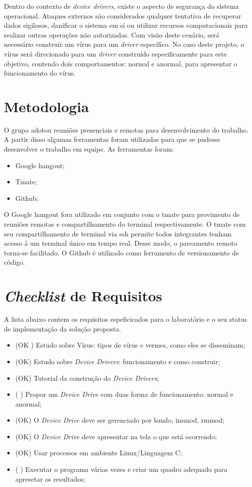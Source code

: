 Dentro do contexto de \textit{device drivers}, existe o aspecto de segurança do sistema operacional.
Ataques externos são considerados qualquer tentativa de recuperar dados sigilosos, danificar
o sistema em sí ou utilizar recursos computacionais para realizar outras operações não autorizadas.
Com visão deste cenário, será necessário construír um vírus para um \textit{driver} específico.
No caso deste projeto, o vírus será direcionado para um \textit{driver} construído especificamente para
este objetivo, contendo dois comportamentos: normal e anormal, para apresentar o
funcionamento do vírus.

\section{Metodologia}

O grupo adotou reuniões presenciais e remotas para desenvolvimento do trabalho. A partir
disso algumas ferramentas foram utilizadas para que se pudesse desenvolver o trabalho em
equipe. As ferramentas foram:

\begin{itemize}
  \item Google hangout;
  \item Tmate;
  \item Github;
\end{itemize}

O Google hangout fora utilizado em conjunto com o tmate para provimento de reuniões remotas
e compartilhamento do terminal respectivamente. O tmate com seu compartilhamento de terminal
via ssh permite todos integrantes tenham acesso á um terminal único em tempo real. Desse modo,
o pareamento remoto torna-se facilitado. O Github é utilizado como ferramento de versionamento
de código. 

\section{\textit{Checklist} de Requisitos}

A lista abaixo contem os requisitos espeficicados para o laboratório e o
seu status de implementação da solução proposta.

\begin{itemize}
  \item (OK ) Estudo sobre Vírus: tipos de vírus e vermes, como eles se disseminam;
  \item (OK) Estudo sobre \textit{Device Drivers}: funcionamento e como construir;
  \item (OK) Tutorial da construção do \textit{Device Drivers};
  \item (  ) Propor um \textit{Device Drive} com duas forma de funcionamento: normal e anormal;
  \item (OK) O \textit{Device Drive} deve ser gerenciado por lsmdo, insmod, rmmod;
  \item (OK) O \textit{Device Drive} deve apresentar na tela o que está ocorrendo;
  \item (OK) Usar processos em ambiente Linux/Linguagem C;
  \item (  ) Executar o programa várias vezes e criar um quadro adequado para apresetar os resultados;
\end{itemize}


